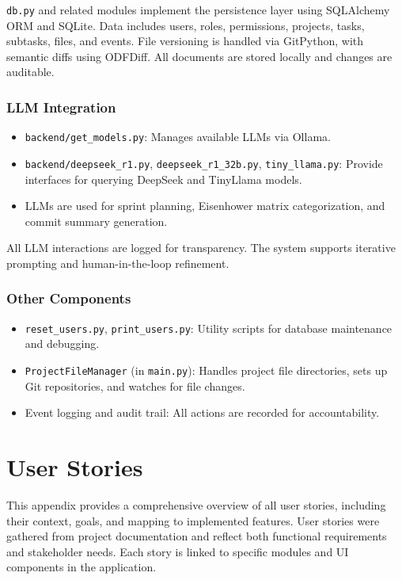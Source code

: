 \documentclass{report}
\begin{document}
\texttt{db.py} and related modules implement the persistence layer using SQLAlchemy ORM and SQLite. Data includes users, roles, permissions, projects, tasks, subtasks, files, and events. File versioning is handled via GitPython, with semantic diffs using ODFDiff. All documents are stored locally and changes are auditable.

\subsection*{LLM Integration}
\begin{itemize}
    \item \texttt{backend/get\_models.py}: Manages available LLMs via Ollama.
    \item \texttt{backend/deepseek\_r1.py}, \texttt{deepseek\_r1\_32b.py}, \texttt{tiny\_llama.py}: Provide interfaces for querying DeepSeek and TinyLlama models.
    \item LLMs are used for sprint planning, Eisenhower matrix categorization, and commit summary generation.
\end{itemize}

All LLM interactions are logged for transparency. The system supports iterative prompting and human-in-the-loop refinement.

\subsection*{Other Components}
\begin{itemize}
    \item \texttt{reset\_users.py}, \texttt{print\_users.py}: Utility scripts for database maintenance and debugging.
    \item \texttt{ProjectFileManager} (in \texttt{main.py}): Handles project file directories, sets up Git repositories, and watches for file changes.
    \item Event logging and audit trail: All actions are recorded for accountability.
\end{itemize}

\chapter{User Stories}\label{UserStories}
This appendix provides a comprehensive overview of all user stories, including their context, goals, and mapping to implemented features. User stories were gathered from project documentation and reflect both functional requirements and stakeholder needs. Each story is linked to specific modules and UI components in the application.
\end{document}
